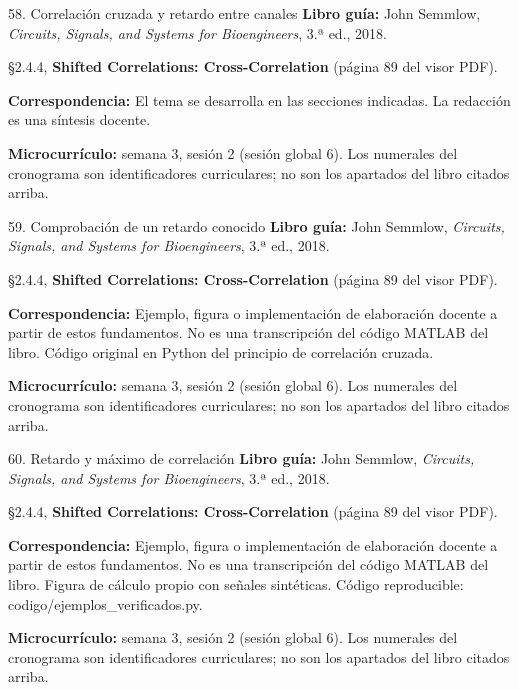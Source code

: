 \documentclass[
  10pt,
  ignorenonframetext,
  aspectratio=169,
  spanish,
]{beamer}
\begin{document}
\begin{frame}{58. Correlación cruzada y retardo entre canales}
\label{correlaciuxf3n-cruzada-y-retardo-entre-canales}
\textbf{Libro guía:} John Semmlow, \emph{Circuits, Signals, and Systems
for Bioengineers}, 3.ª ed., 2018.

§2.4.4, \textbf{Shifted Correlations: Cross-Correlation} (página 89 del
visor PDF).

\textbf{Correspondencia:} El tema se desarrolla en las secciones
indicadas. La redacción es una síntesis docente.

\textbf{Microcurrículo:} semana 3, sesión 2 (sesión global 6). Los
numerales del cronograma son identificadores curriculares; no son los
apartados del libro citados arriba.
\end{frame}

\begin{frame}{59. Comprobación de un retardo conocido}
\label{comprobaciuxf3n-de-un-retardo-conocido}
\textbf{Libro guía:} John Semmlow, \emph{Circuits, Signals, and Systems
for Bioengineers}, 3.ª ed., 2018.

§2.4.4, \textbf{Shifted Correlations: Cross-Correlation} (página 89 del
visor PDF).

\textbf{Correspondencia:} Ejemplo, figura o implementación de
elaboración docente a partir de estos fundamentos. No es una
transcripción del código MATLAB del libro. Código original en Python del
principio de correlación cruzada.

\textbf{Microcurrículo:} semana 3, sesión 2 (sesión global 6). Los
numerales del cronograma son identificadores curriculares; no son los
apartados del libro citados arriba.
\end{frame}

\begin{frame}{60. Retardo y máximo de correlación}
\label{retardo-y-muxe1ximo-de-correlaciuxf3n}
\textbf{Libro guía:} John Semmlow, \emph{Circuits, Signals, and Systems
for Bioengineers}, 3.ª ed., 2018.

§2.4.4, \textbf{Shifted Correlations: Cross-Correlation} (página 89 del
visor PDF).

\textbf{Correspondencia:} Ejemplo, figura o implementación de
elaboración docente a partir de estos fundamentos. No es una
transcripción del código MATLAB del libro. Figura de cálculo propio con
señales sintéticas. Código reproducible:
codigo/ejemplos\_verificados.py.

\textbf{Microcurrículo:} semana 3, sesión 2 (sesión global 6). Los
numerales del cronograma son identificadores curriculares; no son los
apartados del libro citados arriba.
\end{frame}
\end{document}
